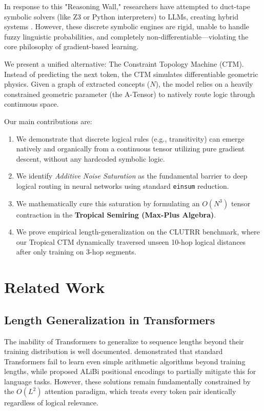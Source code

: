 \documentclass[11pt,a4paper]{article}
\begin{document}
In response to this "Reasoning Wall," researchers have attempted to duct-tape symbolic solvers (like Z3 or Python interpreters) to LLMs, creating hybrid systems \cite{trinh2024alphageometry}. However, these discrete symbolic engines are rigid, unable to handle fuzzy linguistic probabilities, and completely non-differentiable—violating the core philosophy of gradient-based learning.

We present a unified alternative: The Constraint Topology Machine (CTM). Instead of predicting the next token, the CTM simulates differentiable geometric physics. Given a graph of extracted concepts ($N$), the model relies on a heavily constrained geometric parameter (the A-Tensor) to natively route logic through continuous space. 

Our main contributions are:
\begin{enumerate}
    \item We demonstrate that discrete logical rules (e.g., transitivity) can emerge natively and organically from a continuous tensor utilizing pure gradient descent, without any hardcoded symbolic logic.
    \item We identify \textit{Additive Noise Saturation} as the fundamental barrier to deep logical routing in neural networks using standard \texttt{einsum} reduction.
    \item We mathematically cure this saturation by formulating an $O(N^3)$ tensor contraction in the \textbf{Tropical Semiring (Max-Plus Algebra)}.
    \item We prove empirical length-generalization on the CLUTRR benchmark, where our Tropical CTM dynamically traversed unseen 10-hop logical distances after only training on 3-hop segments.
\end{enumerate}

\section{Related Work}

\subsection{Length Generalization in Transformers}
The inability of Transformers to generalize to sequence lengths beyond their training distribution is well documented. \cite{anil2022exploring} demonstrated that standard Transformers fail to learn even simple arithmetic algorithms beyond training lengths, while \cite{press2022train} proposed ALiBi positional encodings to partially mitigate this for language tasks. However, these solutions remain fundamentally constrained by the $O(L^2)$ attention paradigm, which treats every token pair identically regardless of logical relevance.
\end{document}
